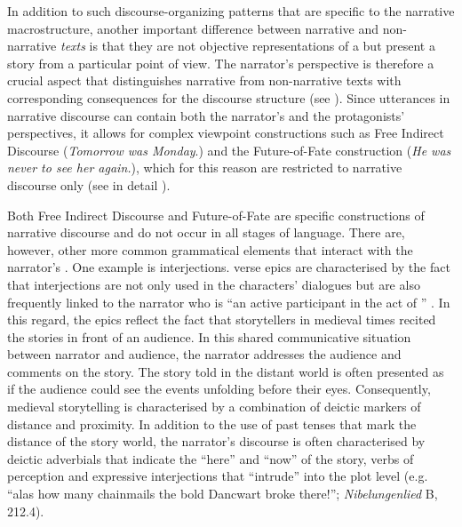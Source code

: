 \documentclass[output=paper,colorlinks,citecolor=brown]{langscibook}
\begin{document}
In addition to such discourse-organizing patterns that are specific to the narrative macrostructure, another important difference between narrative and non-narrative \textit{texts} is that they are not objective representations of a  but present a story from a particular point of view. The narrator's perspective is therefore a crucial aspect that distinguishes narrative from non-narrative texts with corresponding consequences for the discourse structure (see \citealt{Zeman2018}). Since utterances in narrative discourse can contain both the narrator's and the protagonists' perspectives, it allows for complex viewpoint constructions such as Free Indirect Discourse (\textit{Tomorrow was Monday}.) and the Future-of-Fate construction (\textit{He was never to see her again.}), which for this reason are restricted to narrative discourse only (see in detail \citealt{Zeman2018}). 

Both Free Indirect Discourse and Future-of-Fate are specific constructions of narrative discourse and do not occur in all stages of language. There are, however, other more common grammatical elements that interact with the narrator's . One example is interjections.  verse epics are characterised by the fact that interjections are not only used in the characters' dialogues but are also frequently linked to the narrator who is “an active participant in the act of ” \citep[338]{Fludernik2003}. In this regard, the epics reflect the fact that storytellers in medieval times recited the stories in front of an audience. In this shared communicative situation between narrator and audience, the narrator addresses the audience and comments on the story. The story told in the distant world is often presented as if the audience could see the events unfolding before their eyes. Consequently, medieval storytelling is characterised by a combination of deictic markers of distance and proximity. In addition to the use of past tenses that mark the distance of the story world, the narrator's discourse is often characterised by deictic adverbials that indicate the “here” and “now” of the story, verbs of perception and expressive interjections that “intrude” into the plot level (e.g. “alas how many chainmails the bold Dancwart broke there!”; \textit{Nibelungenlied} B, 212.4). 
\end{document}

